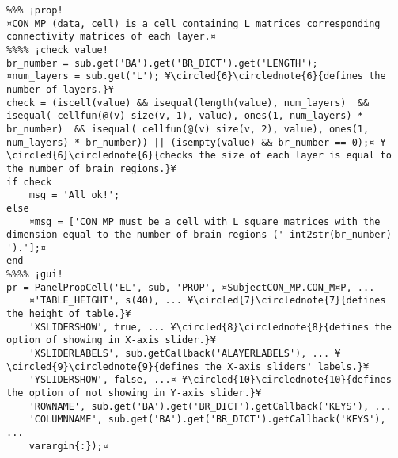 \documentclass{tufte-handout}
\begin{document}
\begin{lstlisting}
%%% ¡prop!
¤CON_MP (data, cell) is a cell containing L matrices corresponding connectivity matrices of each layer.¤
%%%% ¡check_value!
br_number = sub.get('BA').get('BR_DICT').get('LENGTH');
¤num_layers = sub.get('L'); ¥\circled{6}\circlednote{6}{defines the number of layers.}¥
check = (iscell(value) && isequal(length(value), num_layers)  && isequal( cellfun(@(v) size(v, 1), value), ones(1, num_layers) * br_number)  && isequal( cellfun(@(v) size(v, 2), value), ones(1, num_layers) * br_number)) || (isempty(value) && br_number == 0);¤ ¥\circled{6}\circlednote{6}{checks the size of each layer is equal to the number of brain regions.}¥
if check
    msg = 'All ok!';
else   
    ¤msg = ['CON_MP must be a cell with L square matrices with the dimension equal to the number of brain regions (' int2str(br_number) ').'];¤
end
%%%% ¡gui! 
pr = PanelPropCell('EL', sub, 'PROP', ¤SubjectCON_MP.CON_M¤P, ...
    ¤'TABLE_HEIGHT', s(40), ... ¥\circled{7}\circlednote{7}{defines the height of table.}¥
    'XSLIDERSHOW', true, ... ¥\circled{8}\circlednote{8}{defines the option of showing in X-axis slider.}¥
    'XSLIDERLABELS', sub.getCallback('ALAYERLABELS'), ... ¥\circled{9}\circlednote{9}{defines the X-axis sliders' labels.}¥
    'YSLIDERSHOW', false, ...¤ ¥\circled{10}\circlednote{10}{defines the option of not showing in Y-axis slider.}¥
    'ROWNAME', sub.get('BA').get('BR_DICT').getCallback('KEYS'), ...
    'COLUMNNAME', sub.get('BA').get('BR_DICT').getCallback('KEYS'), ...
    varargin{:});¤

\end{lstlisting}
\end{document}
